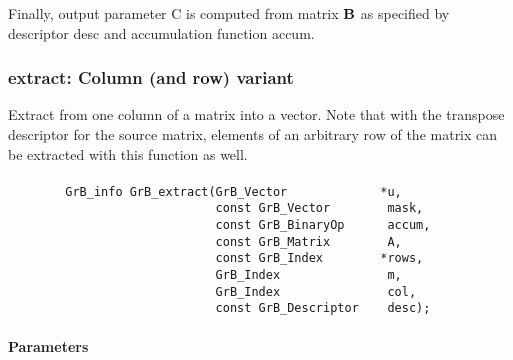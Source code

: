 Finally, output parameter {\sf C} is computed from matrix ${\bf B}$ as
specified by descriptor {\sf desc} and accumulation function {\sf accum}.

\subsubsection{{\sf extract}: Column (and row) variant}

Extract from one column of a matrix into a vector.  Note that with the transpose
descriptor for the source matrix, elements of an arbitrary row of the matrix
can be extracted with this function as well.

\paragraph{\syntax}

\begin{verbatim}
        GrB_info GrB_extract(GrB_Vector             *u,
                             const GrB_Vector        mask,
                             const GrB_BinaryOp      accum,
                             const GrB_Matrix        A,
                             const GrB_Index        *rows,
                             GrB_Index               m,
                             GrB_Index               col,
                             const GrB_Descriptor    desc); 
\end{verbatim}

\paragraph{Parameters}

